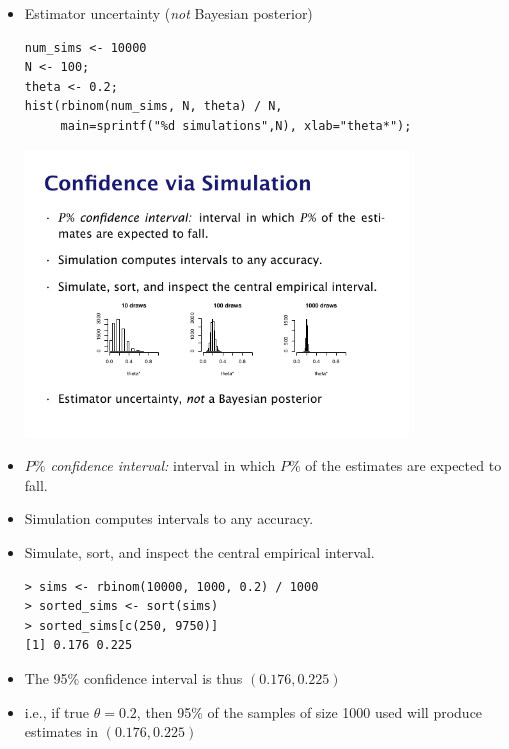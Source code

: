 \documentclass[10pt]{report}
\begin{document}
%
\begin{itemize}
\item Estimator uncertainty (\emph{not} Bayesian posterior)
{\small
\begin{Verbatim}
num_sims <- 10000
N <- 100;  
theta <- 0.2;
hist(rbinom(num_sims, N, theta) / N,
     main=sprintf("%d simulations",N), xlab="theta*");
\end{Verbatim}
}
\vspace*{-12pt}
\begin{center}
\includegraphics[width=0.8\textwidth]{img/hist-10-100-1000.pdf}
\end{center}

\end{itemize}

\begin{itemize}
\item \emph{$P\%$ confidence interval:}  interval in which $P\%$ of the estimates are
expected to fall.
\item Simulation computes intervals to any accuracy.
\item Simulate, sort, and inspect the central empirical interval.
{\small
\begin{Verbatim}
> sims <- rbinom(10000, 1000, 0.2) / 1000
> sorted_sims <- sort(sims)
> sorted_sims[c(250, 9750)]
[1] 0.176 0.225
\end{Verbatim}
}
\item The 95\% confidence interval is thus $(0.176,0.225)$
\item i.e., if true $\theta = 0.2$, then 95\% of the samples of
  size 1000 used will produce estimates in $(0.176,0.225)$
\end{itemize}
\end{document}
